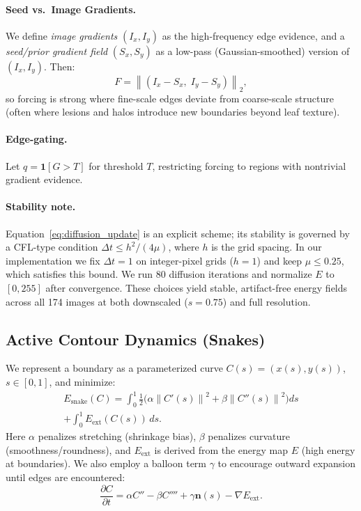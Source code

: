 \documentclass[journal]{IEEEtran}
\newcommand{\grad}{\nabla}
\newcommand{\norm}[1]{\left\lVert #1 \right\rVert}
\begin{document}
\paragraph{Seed vs.\ Image Gradients.}
We define \emph{image gradients} $(I_x,I_y)$ as the high-frequency edge evidence, and a \emph{seed/prior gradient field} $(S_x,S_y)$ as a low-pass (Gaussian-smoothed) version of $(I_x,I_y)$. Then:
\begin{equation}
F = \norm{(I_x-S_x,\; I_y-S_y)}_2,
\end{equation}
so forcing is strong where fine-scale edges deviate from coarse-scale structure (often where lesions and halos introduce new boundaries beyond leaf texture).

\paragraph{Edge-gating.}
Let $q = \mathbf{1}[G > T]$ for threshold $T$, restricting forcing to regions with nontrivial gradient evidence.

\paragraph{Stability note.}
Equation~\eqref{eq:diffusion_update} is an explicit scheme; its stability is governed by a CFL-type condition $\Delta t \leq h^2/(4\mu)$, where $h$ is the grid spacing. In our implementation we fix $\Delta t = 1$ on integer-pixel grids ($h=1$) and keep $\mu\leq 0.25$, which satisfies this bound. We run 80 diffusion iterations and normalize $E$ to $[0,255]$ after convergence. These choices yield stable, artifact-free energy fields across all 174 images at both downscaled ($s{=}0.75$) and full resolution.

\subsection{Active Contour Dynamics (Snakes)}
We represent a boundary as a parameterized curve $C(s) = (x(s), y(s))$, $s\in[0,1]$, and minimize:
\begin{multline}
E_{\mathrm{snake}}(C) = \int_0^1 \tfrac{1}{2}\Big(\alpha \norm{C'(s)}^2 + \beta \norm{C''(s)}^2\Big)ds \\
 + \int_0^1 E_{\mathrm{ext}}(C(s))\,ds.
\end{multline}
Here $\alpha$ penalizes stretching (shrinkage bias), $\beta$ penalizes curvature (smoothness/roundness), and $E_{\mathrm{ext}}$ is derived from the energy map $E$ (high energy at boundaries). We also employ a balloon term $\gamma$ to encourage outward expansion until edges are encountered:
\begin{equation}
\frac{\partial C}{\partial t} = \alpha C'' - \beta C'''' + \gamma \mathbf{n}(s) - \grad E_{\mathrm{ext}}.
\end{equation}
\end{document}
